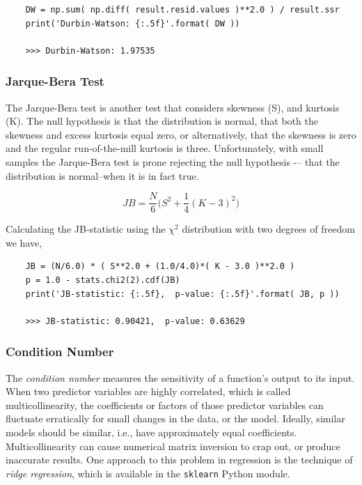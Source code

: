  \begin{lstlisting}
    DW = np.sum( np.diff( result.resid.values )**2.0 ) / result.ssr
    print('Durbin-Watson: {:.5f}'.format( DW ))

    >>> Durbin-Watson: 1.97535
\end{lstlisting}

\subsubsection{Jarque-Bera Test}

The Jarque-Bera test is another test that considers skewness (S), and kurtosis (K). The null hypothesis is that the distribution is normal, that both the skewness and excess kurtosis equal zero, or alternatively, that the skewness is zero and the regular run-of-the-mill kurtosis is three. Unfortunately, with small samples the Jarque-Bera test is prone rejecting the null hypothesis -– that the distribution is normal–when it is in fact true.

\begin{equation}
     JB = \dfrac{N}{6} \biggl( S^{2} + \dfrac{1}{4}(K-3)^{2} \biggr)
\end{equation}

Calculating the JB-statistic using the $\chi^{2}$ distribution with two degrees of freedom we have,

\begin{lstlisting}
    JB = (N/6.0) * ( S**2.0 + (1.0/4.0)*( K - 3.0 )**2.0 )
    p = 1.0 - stats.chi2(2).cdf(JB)
    print('JB-statistic: {:.5f},  p-value: {:.5f}'.format( JB, p ))

    >>> JB-statistic: 0.90421,  p-value: 0.63629

\end{lstlisting}

\subsubsection{Condition Number}

The \emph{condition number}  measures the sensitivity of a function's output to its input. When two predictor variables are highly correlated, which is called multicollinearity, the coefficients or factors of those predictor variables can fluctuate erratically for small changes in the data, or the model. Ideally, similar models should be similar, i.e., have approximately equal coefficients. Multicollinearity can cause numerical matrix inversion to crap out, or produce inaccurate results. One approach to this problem in regression is the technique of \emph{ridge regression}, which is available in the \lstinline{sklearn} Python module.

